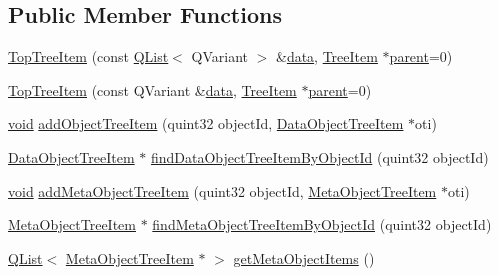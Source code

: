 \subsection*{Public Member Functions}
\begin{DoxyCompactItemize}
\item 
\hyperlink{group___u_a_v_object_browser_plugin_gaf9396b0e4b1f80d5d2eb271a4421aad9}{Top\-Tree\-Item} (const \hyperlink{class_q_list}{Q\-List}$<$ Q\-Variant $>$ \&\hyperlink{glext_8h_a8850df0785e6fbcc2351af3b686b8c7a}{data}, \hyperlink{class_tree_item}{Tree\-Item} $\ast$\hyperlink{group___u_a_v_object_browser_plugin_gaa3a7ba624312b6be70872634db291881}{parent}=0)
\item 
\hyperlink{group___u_a_v_object_browser_plugin_ga5c9d07784db08b50ef3905d2628f61e4}{Top\-Tree\-Item} (const Q\-Variant \&\hyperlink{glext_8h_a8850df0785e6fbcc2351af3b686b8c7a}{data}, \hyperlink{class_tree_item}{Tree\-Item} $\ast$\hyperlink{group___u_a_v_object_browser_plugin_gaa3a7ba624312b6be70872634db291881}{parent}=0)
\item 
\hyperlink{group___u_a_v_objects_plugin_ga444cf2ff3f0ecbe028adce838d373f5c}{void} \hyperlink{group___u_a_v_object_browser_plugin_ga0bf12ffb3c9062983ea24eb70eb04d10}{add\-Object\-Tree\-Item} (quint32 object\-Id, \hyperlink{class_data_object_tree_item}{Data\-Object\-Tree\-Item} $\ast$oti)
\item 
\hyperlink{class_data_object_tree_item}{Data\-Object\-Tree\-Item} $\ast$ \hyperlink{group___u_a_v_object_browser_plugin_ga75602e9fca2d0a49f5463712ac8b1d30}{find\-Data\-Object\-Tree\-Item\-By\-Object\-Id} (quint32 object\-Id)
\item 
\hyperlink{group___u_a_v_objects_plugin_ga444cf2ff3f0ecbe028adce838d373f5c}{void} \hyperlink{group___u_a_v_object_browser_plugin_gad58a2bd3f036f91b012a93876993bdff}{add\-Meta\-Object\-Tree\-Item} (quint32 object\-Id, \hyperlink{class_meta_object_tree_item}{Meta\-Object\-Tree\-Item} $\ast$oti)
\item 
\hyperlink{class_meta_object_tree_item}{Meta\-Object\-Tree\-Item} $\ast$ \hyperlink{group___u_a_v_object_browser_plugin_gaa9790dc57ee25280838c1828d5991f92}{find\-Meta\-Object\-Tree\-Item\-By\-Object\-Id} (quint32 object\-Id)
\item 
\hyperlink{class_q_list}{Q\-List}$<$ \hyperlink{class_meta_object_tree_item}{Meta\-Object\-Tree\-Item} $\ast$ $>$ \hyperlink{group___u_a_v_object_browser_plugin_gad60c68296e476007863dd24d950daf5e}{get\-Meta\-Object\-Items} ()
\end{DoxyCompactItemize}
